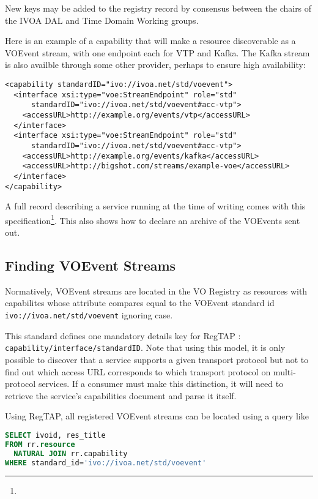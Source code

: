 \documentclass[11pt,a4paper]{ivoa}
\begin{document}
New keys may be added to the registry record by consensus between the
chairs of the IVOA DAL and Time Domain Working groups.

Here is an example of a capability that will make a resource
discoverable as a VOEvent stream, with one endpoint each for VTP and
Kafka.  The Kafka stream is also availble through some other
provider, perhaps to ensure high availability:

\begin{lstlisting}
<capability standardID="ivo://ivoa.net/std/voevent">
  <interface xsi:type="voe:StreamEndpoint" role="std"
      standardID="ivo://ivoa.net/std/voevent#acc-vtp">
    <accessURL>http://example.org/events/vtp</accessURL>
  </interface>
  <interface xsi:type="voe:StreamEndpoint" role="std"
      standardID="ivo://ivoa.net/std/voevent#acc-vtp">
    <accessURL>http://example.org/events/kafka</accessURL>
    <accessURL>http://bigshot.com/streams/example-voe</accessURL>
  </interface>
</capability>
\end{lstlisting}

A full record describing a service running at the time of writing
comes with this
specification\footnote{}.  This also
shows how to declare an archive of the VOEvents sent out.

\subsection{Finding VOEvent Streams}

Normatively, VOEvent streams are located in the VO Registry as resources
with capabilites whose  attribute compares equal to
the VOEvent standard id \nolinkurl{ivo://ivoa.net/std/voevent} ignoring
case.

This standard defines one mandatory details key for RegTAP
\citep{2019ivoa.spec.1011D}: \verb|capability/interface/standardID|.
Note that using this model, it is only possible to discover that a
service supports a given transport protocol but not to find out which
access URL corresponds to which transport protocol on multi-protocol
services.  If a consumer must make this distinction, it will need to
retrieve the service's capabilities document and parse it itself.

Using RegTAP, all registered VOEvent streams
can be located using a query like

\begin{lstlisting}[language=SQL]
SELECT ivoid, res_title
FROM rr.resource
  NATURAL JOIN rr.capability
WHERE standard_id='ivo://ivoa.net/std/voevent'
\end{lstlisting}
\end{document}
